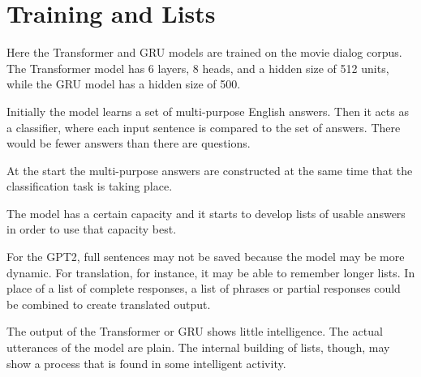 \section{Training and Lists}

Here the Transformer and GRU models are trained on the movie dialog corpus. The Transformer model has 6 layers, 8 heads, and a hidden size of 512 units, while the GRU model has a hidden size of 500.

Initially the model learns a set of multi-purpose English answers. Then it acts as a classifier, where each input sentence is compared to the set of answers. There would be fewer answers than there are questions. 

At the start the multi-purpose answers are constructed at the same time that the classification task is taking place. 

The model has a certain capacity and it starts to develop lists of usable answers in order to use that capacity best.

For the GPT2, full sentences may not be saved because the model may be more dynamic. For translation, for instance, it may be able to remember longer lists. In place of a list of complete responses, a list of phrases or partial responses could be combined to create translated output.

The output of the Transformer or GRU shows little intelligence. The actual utterances of the model are plain. The internal building of lists, though, may show a process that is found in some intelligent activity.